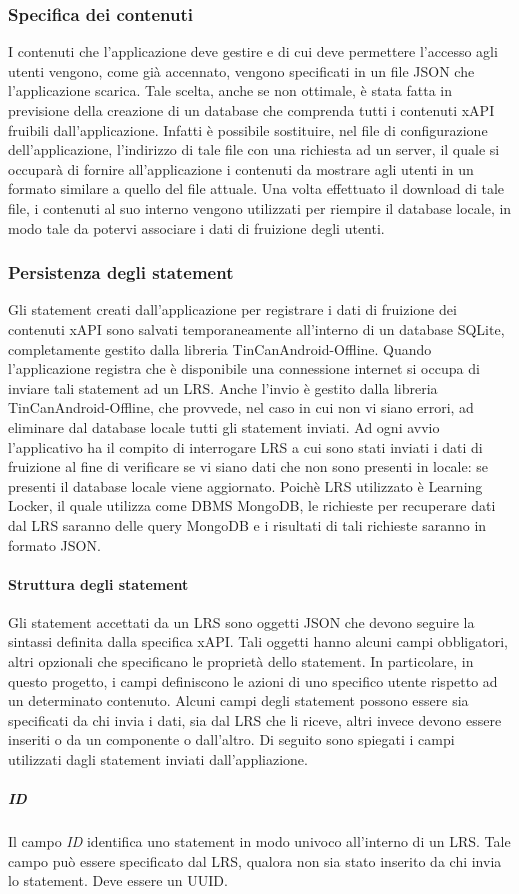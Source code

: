 \documentclass[../Tesi.tex]{subfiles}
\begin{document}
			\subsubsection{Specifica dei contenuti}
			I contenuti che l'applicazione deve gestire e di cui deve permettere l'accesso agli utenti vengono, come già accennato, vengono specificati in un file JSON che l'applicazione scarica. Tale scelta, anche se non ottimale, è stata fatta in previsione della creazione di un database che comprenda tutti i contenuti xAPI fruibili dall'applicazione. Infatti è possibile sostituire, nel file di configurazione dell'applicazione, l'indirizzo di tale file con una richiesta ad un server, il quale si occuparà di fornire all'applicazione i contenuti da mostrare agli utenti in un formato similare a quello del file attuale. Una volta effettuato il download di tale file, i contenuti al suo interno vengono utilizzati per riempire il database locale, in modo tale da potervi associare i dati di fruizione degli utenti.

			\subsubsection{Persistenza degli statement}
			Gli statement creati dall'applicazione per registrare i dati di fruizione dei contenuti xAPI sono salvati temporaneamente all'interno di un database SQLite, completamente gestito dalla libreria TinCanAndroid-Offline. Quando l'applicazione registra che è disponibile una connessione internet si occupa di inviare tali statement ad un LRS. Anche l'invio è gestito dalla libreria TinCanAndroid-Offline, che provvede, nel caso in cui non vi siano errori, ad eliminare dal database locale tutti gli statement inviati. Ad ogni avvio l'applicativo ha il compito di interrogare LRS a cui sono stati inviati i dati di fruizione al fine di verificare se vi siano dati che non sono presenti in locale: se presenti il database locale viene aggiornato. Poichè LRS utilizzato è Learning Locker, il quale utilizza come DBMS MongoDB, le richieste per recuperare dati dal LRS saranno delle query MongoDB e i risultati di tali richieste saranno in formato JSON.
				\paragraph{Struttura degli statement}
				Gli statement accettati da un LRS sono oggetti JSON che devono seguire la sintassi definita dalla specifica xAPI. Tali oggetti hanno alcuni campi obbligatori, altri opzionali che specificano le proprietà dello statement. In particolare, in questo progetto, i campi definiscono le azioni di uno specifico utente rispetto ad un determinato contenuto. Alcuni campi degli statement possono essere sia specificati da chi invia i dati, sia dal LRS che li riceve, altri invece devono essere inseriti o da un componente o dall'altro. Di seguito sono spiegati i campi utilizzati dagli statement inviati dall'appliazione.
					\subparagraph{ID}
					Il campo \textit{ID} identifica uno statement in modo univoco all'interno di un LRS. Tale campo può essere specificato dal LRS, qualora non sia stato inserito da chi invia lo statement. Deve essere un UUID.
\end{document}
